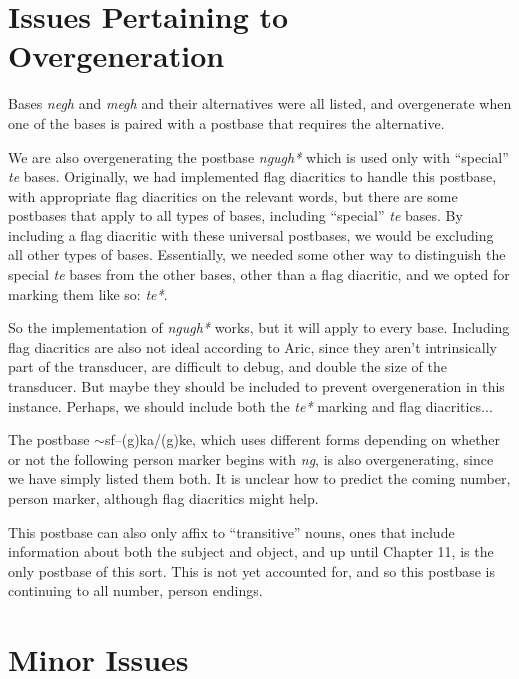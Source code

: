 \documentclass{article}
\begin{document}
\section{Issues Pertaining to Overgeneration}

\item Bases \textit{negh} and \textit{megh} and their alternatives were all listed, and overgenerate when one of the bases is paired with a postbase that requires the alternative.

\item We are also overgenerating the postbase \textit{ngugh*} which is used only with ``special'' \textit{te} bases.
%
Originally, we had implemented flag diacritics to handle this postbase, with appropriate flag diacritics on the relevant words, but there are some postbases that apply to all types of bases, including ``special'' \textit{te} bases.
%
By including a flag diacritic with these universal postbases, we would be excluding all other types of bases.
%
Essentially, we needed some other way to distinguish the special \textit{te} bases from the other bases, other than a flag diacritic, and we opted for marking them like so: \textit{te*}.

So the implementation of \textit{ngugh*} works, but it will apply to every base.
%
Including flag diacritics are also not ideal according to Aric, since they aren't intrinsically part of the transducer, are difficult to debug, and double the size of the transducer.
%
But maybe they should be included to prevent overgeneration in this instance.
%
Perhaps, we should include both the \textit{te*} marking and flag diacritics...

\item The postbase $\sim$sf--(g)ka/(g)ke, which uses different forms depending on whether or not the following person marker begins with \textit{ng}, is also overgenerating, since we have simply listed them both.
%
It is unclear how to predict the coming number, person marker, although flag diacritics might help.

This postbase can also only affix to ``transitive'' nouns, ones that include information about both the subject and object, and up until Chapter 11, is the only postbase of this sort.
%
This is not yet accounted for, and so this postbase is continuing to all number, person endings.


\section{Minor Issues}
\end{document}
